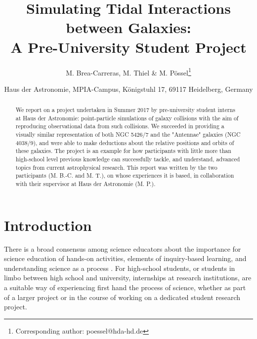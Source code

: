 \documentclass[11pt,twocolumn]{article}
\title{\bf Simulating Tidal Interactions\\ between Galaxies:\\ A Pre-University Student Project}
\author{
    M. Brea-Carreras, M. Thiel \& M. P\"ossel\footnote{Corresponding author: poessel@hda-hd.de}}
\date{\small Haus der Astronomie, MPIA-Campus, K\"onigstuhl 17, 69117 Heidelberg, Germany	}
\begin{document}
\maketitle
 \begin{strip}
\begin{abstract}
We report on a project undertaken in Summer 2017 by pre-university student interns at Haus der Astronomie: point-particle simulations of galaxy collisions with the aim of reproducing observational data from such collisions. We succeeded in providing a visually similar representation of both NGC 5426/7 and the "Antennae" galaxies (NGC 4038/9), and were able to make deductions about the relative positions and orbits of these galaxies. The project is an example for how participants with little more than high-school level previous knowledge can successfully tackle, and understand, advanced topics from current astrophysical research. This report was written by the two participants (M. B.-C. and M. T.), on whose experiences it is based, in collaboration with their supervisor at Haus der Astronomie (M. P.).
    \end{abstract}
\end{strip}
  
  
\section{Introduction} \label{introduction}
There is a broad consensus among science educators about the importance for science education of hands-on activities, elements of inquiry-based learning, and understanding science as a process \cite{Beyond2000,Rocard2007,NRC2011}. For high-school students, or students in limbo between high school and university, internships at research institutions, are a suitable way of experiencing first hand the process of science, whether as part of a larger project or in the course of working on a dedicated student research project.
\end{document}
